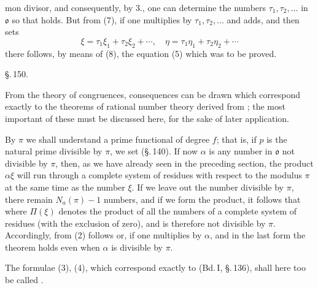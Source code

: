 mon divisor, and consequently, by 3., one can determine the numbers
$\tau_1, \tau_2, \ldots$ in $\mathfrak{o}$ so that
holds. But from (7), if one multiplies by $\tau_1, \tau_2, \ldots$
and adds, and then sets
\[
\xi = \tau_1\xi_1 + \tau_2\xi_2 + \cdots, \quad
\eta = \tau_1\eta_1 + \tau_2\eta_2 + \cdots
\]
there follows, by means of (8), the equation (5) which was to be proved.

\begin{center}
\S.\,150.

\end{center}

From the theory of congruences, consequences can be drawn which
correspond exactly to the theorems of rational number theory derived
from ; the most important of these must be
discussed here, for the sake of later application.

By $\pi$ we shall understand a prime functional of degree $f$; that
is, if $p$ is the natural prime divisible by $\pi$, we set
(\S.\,140). If now $\alpha$ is any number in $\mathfrak{o}$ not
divisible by $\pi$, then, as we have already seen in the preceding
section, the product $\alpha\xi$ will run through a complete system of
residues with respect to the modulus $\pi$ at the same time as the
number $\xi$. If we leave out the number divisible by $\pi$, there
remain $N_a(\pi) - 1$ numbers, and if we form the product, it follows
that
where $\Pi(\xi)$ denotes the product of all the numbers of a complete
system of residues (with the exclusion of zero), and is therefore not
divisible by $\pi$. Accordingly, from (2) follows
or, if one multiplies by $\alpha$,
and in the last form the theorem holds even when $\alpha$ is divisible
by $\pi$.

The formulae (3), (4), which correspond exactly to
 (Bd.\,I, \S.\,136), shall here too be
called .

